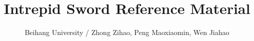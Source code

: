 \documentclass[a4paper]{article}
\begin{document}
\title{\Huge \bf Intrepid Sword Reference Material}
\author{Beihang University / Zhong Zihao, Peng Maoxiaomin, Wen Jiahao}

\maketitle

\begin{multicols*}{2}
\tableofcontents
\end{multicols*}

\clearpage

\columnseprule=0pt
\fontsize{7pt}{9pt}
\selectfont

\setcounter{page}{1}
\begin{multicols*}{2}

\end{multicols*}
\end{document}
